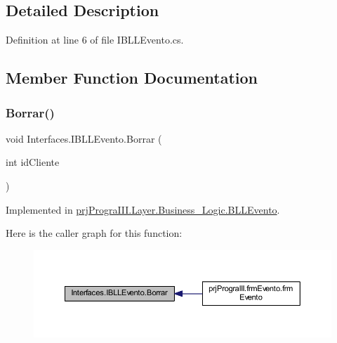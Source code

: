 \subsection{Detailed Description}


Definition at line 6 of file I\+B\+L\+L\+Evento.\+cs.



\subsection{Member Function Documentation}
\hypertarget{interface_interfaces_1_1_i_b_l_l_evento_a5e0e267f475664adbac7b86dc847a1a7}{}\label{interface_interfaces_1_1_i_b_l_l_evento_a5e0e267f475664adbac7b86dc847a1a7} 
\subsubsection{\texorpdfstring{Borrar()}{Borrar()}}
{\footnotesize\ttfamily void Interfaces.\+I\+B\+L\+L\+Evento.\+Borrar (\begin{DoxyParamCaption}\item[{int}]{id\+Cliente }\end{DoxyParamCaption})}



Implemented in \hyperlink{classprj_progra_i_i_i_1_1_layer_1_1_business___logic_1_1_b_l_l_evento_a2678321a8382a9304c95e8fc996d088e}{prj\+Progra\+I\+I\+I.\+Layer.\+Business\+\_\+\+Logic.\+B\+L\+L\+Evento}.

Here is the caller graph for this function\+:
\nopagebreak
\begin{figure}[H]
\begin{center}
\leavevmode
\includegraphics[width=350pt]{interface_interfaces_1_1_i_b_l_l_evento_a5e0e267f475664adbac7b86dc847a1a7_icgraph}
\end{center}
\end{figure}
\hypertarget{interface_interfaces_1_1_i_b_l_l_evento_a1eae40dd8ed0fc8cd36ee9e4ed42f10e}{}\label{interface_interfaces_1_1_i_b_l_l_evento_a1eae40dd8ed0fc8cd36ee9e4ed42f10e} 

